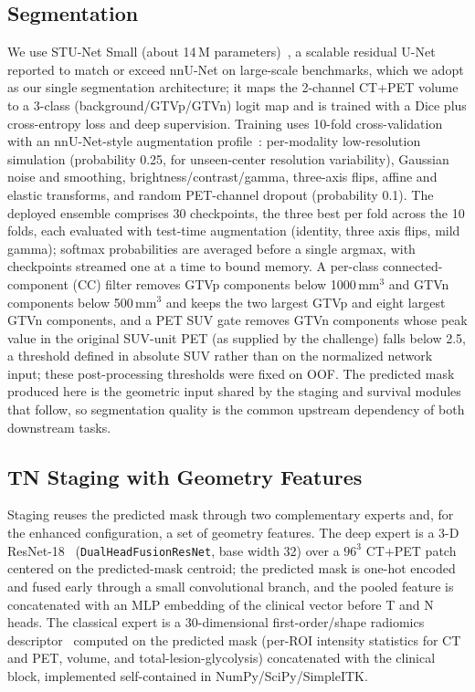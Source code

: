 \documentclass[runningheads]{llncs}
\begin{document}
\subsection{Segmentation}
\label{sec:seg}

We use STU-Net Small (about 14\,M parameters)~\cite{ref6}, a scalable residual U-Net reported to match or exceed nnU-Net on large-scale benchmarks, which we adopt as our single segmentation architecture; it maps the 2-channel CT+PET volume to a 3-class (background/GTVp/GTVn) logit map and is trained with a Dice plus cross-entropy loss and deep supervision. Training uses 10-fold cross-validation with an nnU-Net-style augmentation profile~\cite{ref5}: per-modality low-resolution simulation (probability 0.25, for unseen-center resolution variability), Gaussian noise and smoothing, brightness/contrast/gamma, three-axis flips, affine and elastic transforms, and random PET-channel dropout (probability 0.1). The deployed ensemble comprises 30 checkpoints, the three best per fold across the 10 folds, each evaluated with test-time augmentation (identity, three axis flips, mild gamma); softmax probabilities are averaged before a single argmax, with checkpoints streamed one at a time to bound memory. A per-class connected-component (CC) filter removes GTVp components below 1000\,mm$^3$ and GTVn components below 500\,mm$^3$ and keeps the two largest GTVp and eight largest GTVn components, and a PET SUV gate removes GTVn components whose peak value in the original SUV-unit PET (as supplied by the challenge) falls below 2.5, a threshold defined in absolute SUV rather than on the normalized network input; these post-processing thresholds were fixed on OOF. The predicted mask produced here is the geometric input shared by the staging and survival modules that follow, so segmentation quality is the common upstream dependency of both downstream tasks.
\subsection{TN Staging with Geometry Features}
\label{sec:staging}

Staging reuses the predicted mask through two complementary experts and, for the enhanced configuration, a set of geometry features. The deep expert is a 3-D ResNet-18~\cite{ref19} (\texttt{DualHeadFusionResNet}, base width 32) over a $96^3$ CT+PET patch centered on the predicted-mask centroid; the predicted mask is one-hot encoded and fused early through a small convolutional branch, and the pooled feature is concatenated with an MLP embedding of the clinical vector before T and N heads. The classical expert is a 30-dimensional first-order/shape radiomics descriptor~\cite{ref8,ref20} computed on the predicted mask (per-ROI intensity statistics for CT and PET, volume, and total-lesion-glycolysis) concatenated with the clinical block, implemented self-contained in NumPy/SciPy/SimpleITK.
\end{document}
